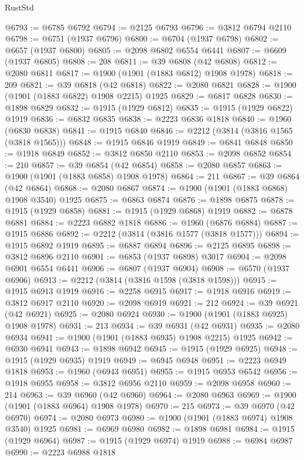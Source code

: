 \begin{lexlean}{RustStd}
\begin{coremodule}
{\begin{coremodule}
{{{{{{{{{{{{{{{{{{{{{{{{{{{{{{{{{{{{{{{{{{{@6793 := @6785 @6792
@6794 := @2125 @6793
@6796 := @3812 @6794 @2110
@6798 := @6751 (@1937 @6796)
@6800 := @6704 (@1937 @6798)
@6802 := @6657 (@1937 @6800)
@6805 := @2098 @6802 @6554 @6441
@6807 := @6609 (@1937 @6805)
@6808 := 208
@6811 := @39 @6808 (@42 @6808)
@6812 := @2080 @6811
@6817 := @1900 (@1901 (@1883 @6812) @1908 @1978)
@6818 := 209
@6821 := @39 @6818 (@42 @6818)
@6822 := @2080 @6821
@6828 := @1900 (@1901 (@1883 @6822) @1908 @2215) @1925
@6829 := @6817 @6828
@6830 := @1898 @6829
@6832 := @1915 (@1929 @6812)
@6835 := @1915 (@1929 @6822) @1919
@6836 := @6832 @6835
@6838 := @2223 @6836 @1818
@6840 := @1960 (@6830 @6838)
@6841 := @1915 @6840
@6846 := @2212 (@3814 (@3816 @1565 (@3818 @1565)))
@6848 := @1915 @6846 @1919
@6849 := @6841 @6848
@6850 := @1918 @6849
@6852 := @3812 @6850 @2110
@6853 := @2098 @6852
@6854 := 210
@6857 := @39 @6854 (@42 @6854)
@6858 := @2080 @6857
@6863 := @1900 (@1901 (@1883 @6858) @1908 @1978)
@6864 := 211
@6867 := @39 @6864 (@42 @6864)
@6868 := @2080 @6867
@6874 := @1900 (@1901 (@1883 @6868) @1908 @3540) @1925
@6875 := @6863 @6874
@6876 := @1898 @6875
@6878 := @1915 (@1929 @6858)
@6881 := @1915 (@1929 @6868) @1919
@6882 := @6878 @6881
@6884 := @2223 @6882 @1818
@6886 := @1960 (@6876 @6884)
@6887 := @1915 @6886
@6892 := @2212 (@3814 (@3816 @1577 (@3818 @1577)))
@6894 := @1915 @6892 @1919
@6895 := @6887 @6894
@6896 := @2125 @6895
@6898 := @3812 @6896 @2110
@6901 := @6853 (@1937 @6898) @3017
@6904 := @2098 @6901 @6554 @6441
@6906 := @6807 (@1937 @6904)
@6908 := @6570 (@1937 @6906)
@6913 := @2212 (@3814 (@3816 @1598 (@3818 @1598)))
@6915 := @1915 @6913 @1919
@6916 := @2258 @6915
@6917 := @1918 @6916
@6919 := @3812 @6917 @2110
@6920 := @2098 @6919
@6921 := 212
@6924 := @39 @6921 (@42 @6921)
@6925 := @2080 @6924
@6930 := @1900 (@1901 (@1883 @6925) @1908 @1978)
@6931 := 213
@6934 := @39 @6931 (@42 @6931)
@6935 := @2080 @6934
@6941 := @1900 (@1901 (@1883 @6935) @1908 @2215) @1925
@6942 := @6930 @6941
@6943 := @1898 @6942
@6945 := @1915 (@1929 @6925)
@6948 := @1915 (@1929 @6935) @1919
@6949 := @6945 @6948
@6951 := @2223 @6949 @1818
@6953 := @1960 (@6943 @6951)
@6955 := @1915 @6953 @6542
@6956 := @1918 @6955
@6958 := @3812 @6956 @2110
@6959 := @2098 @6958
@6960 := 214
@6963 := @39 @6960 (@42 @6960)
@6964 := @2080 @6963
@6969 := @1900 (@1901 (@1883 @6964) @1908 @1978)
@6970 := 215
@6973 := @39 @6970 (@42 @6970)
@6974 := @2080 @6973
@6980 := @1900 (@1901 (@1883 @6974) @1908 @3540) @1925
@6981 := @6969 @6980
@6982 := @1898 @6981
@6984 := @1915 (@1929 @6964)
@6987 := @1915 (@1929 @6974) @1919
@6988 := @6984 @6987
@6990 := @2223 @6988 @1818
}}}}}}}}}}}}}}}}}}}}}}}}}}}}}}}}}}}}}}}}}}}
\end{coremodule}}
\end{coremodule}
\end{lexlean}
